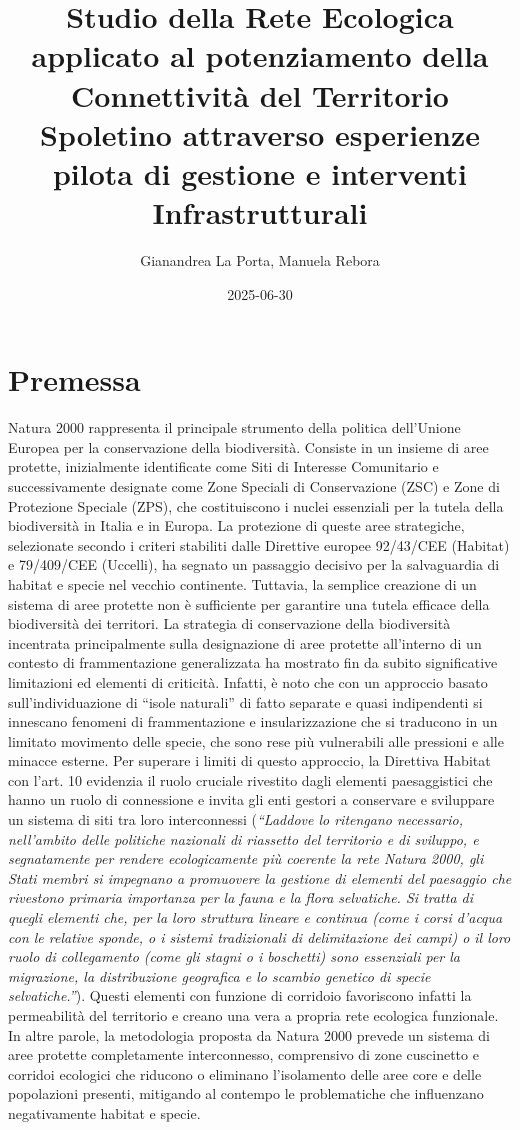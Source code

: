 \documentclass[
]{book}
\title{Studio della Rete Ecologica applicato al potenziamento della Connettività del Territorio Spoletino attraverso esperienze pilota di gestione e interventi Infrastrutturali}
\author{Gianandrea La Porta, Manuela Rebora}
\date{2025-06-30}
\begin{document}
\maketitle

{
\setcounter{tocdepth}{1}
\tableofcontents
}
\chapter{Premessa}\label{premessa}

Natura 2000 rappresenta il principale strumento della politica dell'Unione Europea per la conservazione della biodiversità. Consiste in un insieme di aree protette, inizialmente identificate come Siti di Interesse Comunitario e successivamente designate come Zone Speciali di Conservazione (ZSC) e Zone di Protezione Speciale (ZPS), che costituiscono i nuclei essenziali per la tutela della biodiversità in Italia e in Europa. La protezione di queste aree strategiche, selezionate secondo i criteri stabiliti dalle Direttive europee 92/43/CEE (Habitat) e 79/409/CEE (Uccelli), ha segnato un passaggio decisivo per la salvaguardia di habitat e specie nel vecchio continente. Tuttavia, la semplice creazione di un sistema di aree protette non è sufficiente per garantire una tutela efficace della biodiversità dei territori. La strategia di conservazione della biodiversità incentrata principalmente sulla designazione di aree protette all'interno di un contesto di frammentazione generalizzata ha mostrato fin da subito significative limitazioni ed elementi di criticità. Infatti, è noto che con un approccio basato sull'individuazione di ``isole naturali'' di fatto separate e quasi indipendenti si innescano fenomeni di frammentazione e insularizzazione che si traducono in un limitato movimento delle specie, che sono rese più vulnerabili alle pressioni e alle minacce esterne. Per superare i limiti di questo approccio, la Direttiva Habitat con l'art. 10 evidenzia il ruolo cruciale rivestito dagli elementi paesaggistici che hanno un ruolo di connessione e invita gli enti gestori a conservare e sviluppare un sistema di siti tra loro interconnessi (\emph{``Laddove lo ritengano necessario, nell'ambito delle politiche nazionali di riassetto del territorio e di sviluppo, e segnatamente per rendere ecologicamente più coerente la rete Natura 2000, gli Stati membri si impegnano a promuovere la gestione di elementi del paesaggio che rivestono primaria importanza per la fauna e la flora selvatiche. Si tratta di quegli elementi che, per la loro struttura lineare e continua (come i corsi d'acqua con le relative sponde, o i sistemi tradizionali di delimitazione dei campi) o il loro ruolo di collegamento (come gli stagni o i boschetti) sono essenziali per la migrazione, la distribuzione geografica e lo scambio genetico di specie selvatiche.''}). Questi elementi con funzione di corridoio favoriscono infatti la permeabilità del territorio e creano una vera a propria rete ecologica funzionale. In altre parole, la metodologia proposta da Natura 2000 prevede un sistema di aree protette completamente interconnesso, comprensivo di zone cuscinetto e corridoi ecologici che riducono o eliminano l'isolamento delle aree core e delle popolazioni presenti, mitigando al contempo le problematiche che influenzano negativamente habitat e specie.
\end{document}
